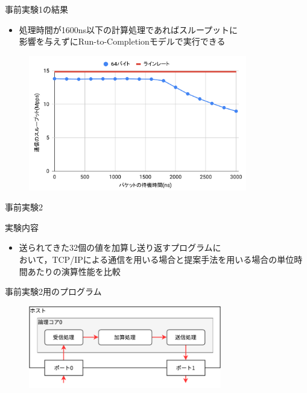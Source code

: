 \documentclass[12pt, unicode]{beamer}
\begin{document}
\begin{frame}{事前実験1の結果}
  \begin{itemize}
    \item 処理時間が1600ns以下の計算処理であればスループットに\\影響を与えずにRun-to-Completionモデルで実行できる
  \end{itemize}

  \begin{figure}[h]
    \centering
    \includegraphics[width=0.85\textwidth]{pictures/PreExperimentOneResult.pdf}
  \end{figure}
\end{frame}

\begin{frame}{事前実験2}
  \begin{block}{実験内容}
    \begin{itemize}
      \item 送られてきた32個の値を加算し送り返すプログラムに\\おいて，TCP/IPによる通信を用いる場合と提案手法を用いる場合の単位時間あたりの演算性能を比較
    \end{itemize}
  \end{block}

  \begin{block}{事前実験2用のプログラム}
    \begin{figure}[h]
      \centering
      \includegraphics[width=0.75\textwidth]{pictures/PreExperimentTwo.pdf}
    \end{figure}
  \end{block}
\end{frame}
\end{document}
